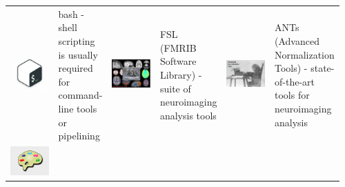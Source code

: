 \documentclass[final]{beamer}\usepackage[]{graphicx}\usepackage[]{color}
\begin{document}
\begin{frame}[fragile]
\begin{table}[!htb]
\begin{minipage}{0.40\linewidth}
\vspace*{1cm}
\vfill


\begin{tabular}{>{\centering}m{0.16\linewidth}>{\centering}m{0.16\linewidth}|>{\centering}m{0.16\linewidth}>{\centering}m{0.16\linewidth}|>{\centering}m{0.16\linewidth}>{\centering\arraybackslash}m{0.16\linewidth}}
\includegraphics[clip, width=5cm, keepaspectratio]{figures/Bash-new-600x600.png} 
& bash - shell scripting is usually required for command-line tools or pipelining
& \includegraphics[clip, width=5cm, keepaspectratio]{figures/FSL.png} 
& FSL (FMRIB Software Library) - suite of neuroimaging analysis tools
& \includegraphics[clip, width=5cm, keepaspectratio]{figures/ants.png} 
& ANTs (Advanced Normalization Tools) - state-of-the-art tools for neuroimaging analysis \\
\includegraphics[clip, width=5cm, keepaspectratio]{figures/mricrogl.png}

\end{tabular}
\end{minipage}
\end{table}
\end{frame}
\end{document}
